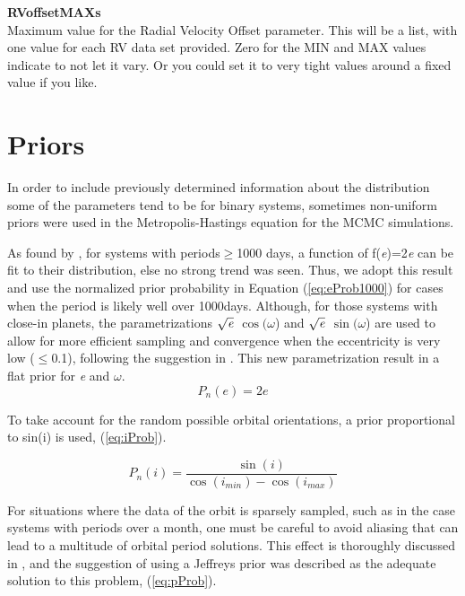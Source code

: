 \documentclass[12pt,preprint]{aastex}
\begin{document}
{\bf RVoffsetMAXs}\\
Maximum value for the Radial Velocity Offset parameter.  This will be a list, with one value for each RV data set provided.
Zero for the MIN and MAX values indicate to not let it vary.  Or you could set it to very tight values around a fixed value if you like.



\section{Priors}\label{sec:priors}

In order to include previously determined information about the distribution some of the parameters tend to be for binary systems, sometimes non-uniform priors were used in the Metropolis-Hastings equation for the MCMC simulations.

As found by \citet{duquennoy1991}, for systems with periods$\geq$1000 days, a function of f({\it e})=2{\it e} can be fit to their distribution, else no strong trend was seen.  Thus, we adopt this result and use the normalized prior probability in Equation (\ref{eq:eProb1000}) for cases when the period is likely well over 1000days.  Although, for those systems with close-in planets, the parametrizations $\sqrt{{\it e}}$ $\cos(\omega$) and $\sqrt{{\it e}}$ $\sin(\omega$) are used to allow for more efficient sampling and convergence when the eccentricity is very low ($\le$0.1), following the suggestion in \citet{albrecht2012}. This new parametrization result in a flat prior for {\it e} and $\omega$.
\begin{equation}\label{eq:eProb1000}
P_n(e) =  2e
\end{equation}

 
To take account for the random possible orbital orientations, a prior proportional to sin(i) is used, (\ref{eq:iProb}).

\begin{equation}\label{eq:iProb}
P_n(i) =  \frac{\sin(i)}{\cos(i_{min})-\cos(i_{max})}
\end{equation}

For situations where the data of the orbit is sparsely sampled, such as in the case systems with periods over a month, one must be careful to avoid aliasing that can lead to a multitude of orbital period solutions.  This effect is thoroughly discussed in \citet{gregory2005}, and the suggestion of using a Jeffreys prior was described as the adequate solution to this problem, (\ref{eq:pProb}).
\end{document}
